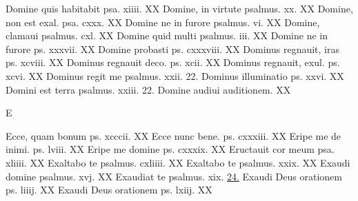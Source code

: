 \documentclass[a5paper,10pt]{book}
\begin{document}
\begin{multicols}{2}
\newline Domine quis habitabit psa. xiiii. \hfill XX
\newline Domine, in virtute psalmus. xx. \hfill XX
\newline Domine, non est exal. psa. cxxx. \hfill XX
\newline Domine ne in furore psalmus. vi. \hfill XX
\newline Domine, clamaui psalmus. cxl. \hfill XX
\newline Domine quid multi psalmus. iii. \hfill XX
\newline Domine ne in furore ps. xxxvii. \hfill XX
\newline Domine probasti ps. cxxxviii. \hfill XX
\newline Dominus regnauit, iras ps. xcviii. \hfill XX
\newline Dominus regnauit deco. ps. xcii. \hfill XX
\newline Dominus regnauit, exul. ps. xcvi. \hfill XX
\newline Dominus regit me psalmus. xxii. \hfill 22.
\newline Dominus illuminatio ps. xxvi. \hfill XX
\newline Domini est terra psalmus. xxiii. \hfill 22.
\newline Domine audiui auditionem. \hfill XX
\newline \vspace{-1.75em}
\begin{center}
\color{red} E
\end{center}
\vspace{-.75em}
\par \noindent Ecce, quam bonum ps. xcccii. \hfill XX
\newline Ecce nunc bene. ps. cxxxiii. \hfill XX
\newline Eripe me de inimi. ps. lviii. \hfill XX
\newline Eripe me domine ps. cxxxix. \hfill XX
\newline Eructauit cor meum psa. xliiii. \hfill XX
\newline Exaltabo te psalmus. cxliiii. \hfill XX
\newline Exaltabo te psalmus. xxix. \hfill XX
\newline Exaudi domine psalmus. xvj. \hfill XX
\newline Exaudiat te psalmus. xix. \hfill \hyperlink{ps19}{24.}
\newline Exaudi Deus orationem ps. liiij. \hfill XX
\newline Exaudi Deus orationem ps. lxiij. \hfill XX

\end{multicols}
\end{document}
